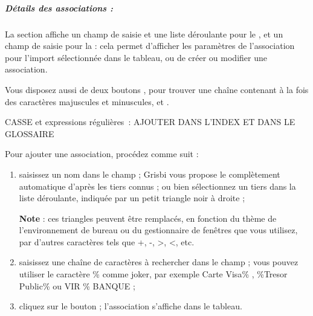\subparagraph{Détails des associations :\label{setup-general-importlinks-details}}
La section  affiche un champ de saisie et une liste déroulante pour le , et un champ de saisie pour la  : cela permet d'afficher les paramètres de l'association pour l'import sélectionnée dans le tableau, ou de créer ou modifier une association.


Vous disposez aussi de deux boutons , pour trouver une chaîne contenant à la fois des caractères majuscules et minuscules, et .

CASSE et expressions régulières : AJOUTER DANS L'INDEX ET DANS LE GLOSSAIRE



\ifIllustration
\fi


Pour ajouter une association, procédez comme suit :
\begin{enumerate}
	\item saisissez un nom dans le champ  ; Grisbi vous propose le complètement automatique d'après les tiers connus ; ou bien sélectionnez un tiers dans la liste déroulante, indiquée par un petit triangle noir à droite ;
	
			\textbf{Note} : ces triangles peuvent être remplacés, en fonction du thème de l'environnement de bureau ou du gestionnaire de fenêtres que vous utilisez, par d'autres caractères tels que +, -, >, <, etc.
	\item saisissez une chaîne de caractères à rechercher dans le champ  ; vous pouvez utiliser le caractère \og \% \fg{} comme joker, par exemple \og Carte Visa\% \fg{}, \og\%Tresor Public\% \fg{} ou \og VIR \% BANQUE \fg{} ;
	\item cliquez sur le bouton  ; l'association s'affiche dans le tableau.
\end{enumerate}


